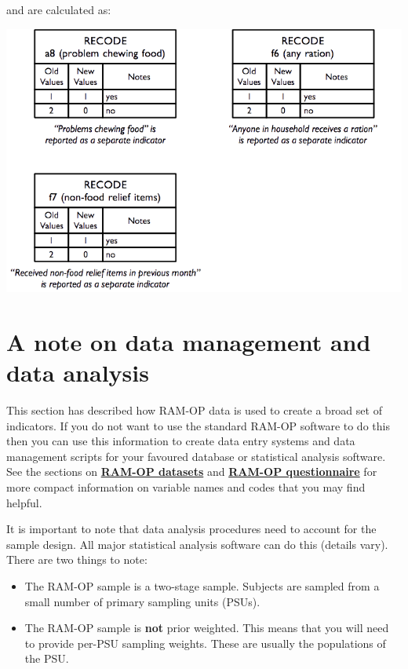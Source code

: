 \documentclass[12pt,a4paper]{book}
\providecommand{\tightlist}{%
  \setlength{\itemsep}{0pt}\setlength{\parskip}{0pt}}
\theoremstyle{definition}
\theoremstyle{definition}
\theoremstyle{definition}
\theoremstyle{remark}
\begin{document}
\newpage

and are calculated as:

\begin{center}\includegraphics[width=9.76in]{figures/indicators30} \end{center}

\hypertarget{a-note-on-data-management-and-data-analysis}{%
\section{A note on data management and data
analysis}\label{a-note-on-data-management-and-data-analysis}}

This section has described how RAM-OP data is used to create a broad set
of indicators. If you do not want to use the standard RAM-OP software to
do this then you can use this information to create data entry systems
and data management scripts for your favoured database or statistical
analysis software. See the sections on
\protect\hyperlink{datasets}{\textbf{RAM-OP datasets}} and
\protect\hyperlink{questionnaire}{\textbf{RAM-OP questionnaire}} for
more compact information on variable names and codes that you may find
helpful.

It is important to note that data analysis procedures need to account
for the sample design. All major statistical analysis software can do
this (details vary). There are two things to note:

\begin{itemize}
\tightlist
\item
  The RAM-OP sample is a two-stage sample. Subjects are sampled from a
  small number of primary sampling units (PSUs).
\item
  The RAM-OP sample is \textbf{not} prior weighted. This means that you
  will need to provide per-PSU sampling weights. These are usually the
  populations of the PSU.
\end{itemize}
\end{document}
